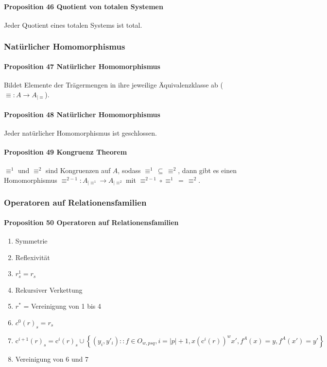 \paragraph{Proposition 46 Quotient von totalen Systemen}
Jeder Quotient eines totalen Systems ist total.

\subsubsection{Natürlicher Homomorphismus}

\paragraph{Proposition 47 Natürlicher Homomorphismus}
Bildet Elemente der Trägermengen in ihre jeweilige Äquivalenzklasse ab ($\equiv : A \rightarrow A_{|\equiv}$). 

\paragraph{Proposition 48 Natürlicher Homomorphismus}
Jeder natürlicher Homomorphismus ist geschlossen.

\paragraph{Proposition 49 Kongruenz Theorem}
$\equiv^{1}$ und $\equiv^{2}$ sind Kongruenzen auf $A$, sodass $\equiv^{1}\,\subseteq\,\equiv^{2}$, dann gibt es einen Homomorphismus $\equiv^{2-1}:A_{|\equiv^{1}}\rightarrow A_{|\equiv^{2}}$
mit $\equiv^{2-1}\circ\equiv^{1}\,=\,\equiv^{2}$.


\subsubsection{Operatoren auf Relationensfamilien}

\paragraph{Proposition 50 Operatoren auf Relationensfamilien}

\begin{enumerate}
\item Symmetrie
\item Reflexivität
\item $r^1_s = r_s$
\item Rekursiver Verkettung 
\item $r^*$ = Vereinigung von 1 bis 4
\item $c^0(r)_s = r_s$
\item $\textrm{c}^{i+1}(r)_{s}=\textrm{c}^{i}(r)_{s}\cup\left\{ \left(y_{i},y'_{i}\right)::f\in O_{w,psq},i=|p|+1,x\left(\textrm{c}^{i}(r)\right)^{w}x',f^{A}(x)=y,f^{A}(x')=y'\right\}$
\item Vereinigung von 6 und 7
\end{enumerate}


